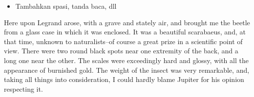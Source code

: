 \documentclass{article}
\begin{document}

\begin{itemize}
  \item Tambahkan spasi, tanda baca, dll
\end{itemize}

Here upon Legrand arose, with a grave and stately air, and brought me the beetle from a glass case in which it was enclosed. It was a beautiful scarabaeus, and, at that time, unknown to naturalists--of course a great prize in a scientific point of view. There were two round black spots near one extremity of the back, and a long one near the other. The scales were exceedingly hard and glossy, with all the appearance of burnished gold. The weight of the insect was very remarkable, and, taking all things into consideration, I could hardly blame Jupiter for his opinion respecting it.
\end{document}
